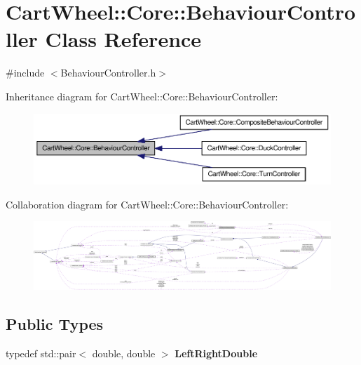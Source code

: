 \hypertarget{classCartWheel_1_1Core_1_1BehaviourController}{
\section{CartWheel::Core::BehaviourController Class Reference}
\label{classCartWheel_1_1Core_1_1BehaviourController}
}


{\ttfamily \#include $<$BehaviourController.h$>$}



Inheritance diagram for CartWheel::Core::BehaviourController:\nopagebreak
\begin{figure}[H]
\begin{center}
\leavevmode
\includegraphics[width=400pt]{classCartWheel_1_1Core_1_1BehaviourController__inherit__graph}
\end{center}
\end{figure}


Collaboration diagram for CartWheel::Core::BehaviourController:\nopagebreak
\begin{figure}[H]
\begin{center}
\leavevmode
\includegraphics[width=400pt]{classCartWheel_1_1Core_1_1BehaviourController__coll__graph}
\end{center}
\end{figure}
\subsection*{Public Types}
\begin{DoxyCompactItemize}
\item 
\hypertarget{classCartWheel_1_1Core_1_1BehaviourController_a1365b1cad6178660401a9dc7a5140eed}{
typedef std::pair$<$ double, double $>$ {\bfseries LeftRightDouble}}
\label{classCartWheel_1_1Core_1_1BehaviourController_a1365b1cad6178660401a9dc7a5140eed}

\end{DoxyCompactItemize}
